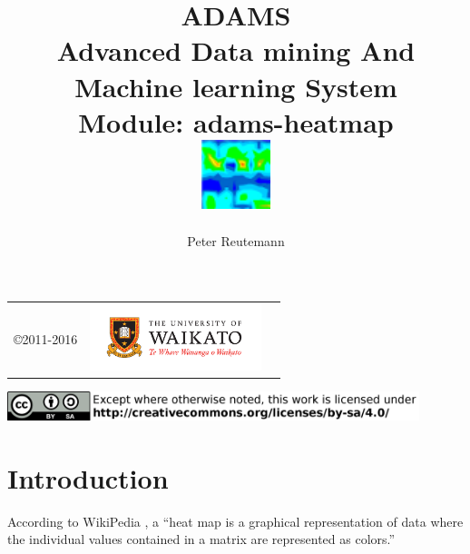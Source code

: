 \documentclass[a4paper]{book}
\title{
  \textbf{ADAMS} \\
  {\Large \textbf{A}dvanced \textbf{D}ata mining \textbf{A}nd \textbf{M}achine
  learning \textbf{S}ystem} \\
  {\Large Module: adams-heatmap} \\
  \vspace{1cm}
  \includegraphics[width=2cm]{images/heatmap-module.png} \\
}
\author{
  Peter Reutemann
}
\begin{document}
\begin{titlepage}
\maketitle

\thispagestyle{empty}
\center
\begin{table}[b]
	\begin{tabular}{c l l}
		\parbox[c][2cm]{2cm}{\copyright 2011-2016} &
		\parbox[c][2cm]{5cm}{\includegraphics[width=5cm]{images/coat_of_arms.pdf}} \\
	\end{tabular}
	\includegraphics[width=12cm]{images/cc.png} \\
\end{table}

\end{titlepage}

\tableofcontents
\listoffigures

\chapter{Introduction}
According to WikiPedia \cite{heatmap}, a ``heat map is a graphical representation of data 
where the individual values contained in a matrix are represented as 
colors.''

\end{document}
